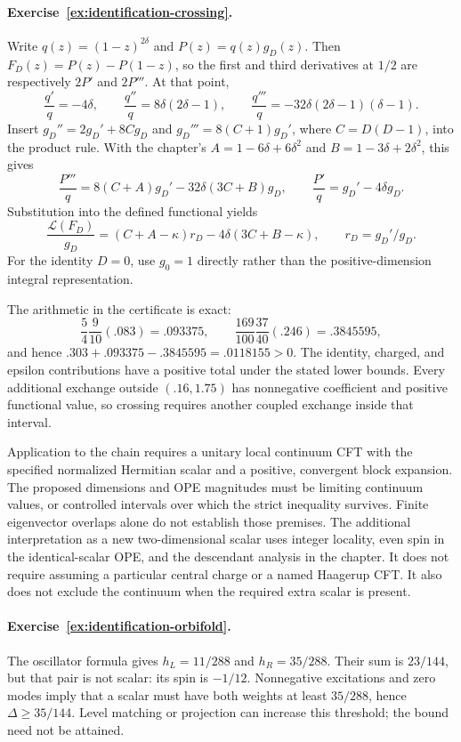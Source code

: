 \paragraph{Exercise~\ref{ex:identification-crossing}.}
\label{sol:ex:identification-crossing}
Write $q(z)=(1-z)^{2\delta}$ and $P(z)=q(z)g_D(z)$.
Then $F_D(z)=P(z)-P(1-z)$, so the first and third derivatives
at $1/2$ are respectively $2P'$ and $2P'''$. At that point,
\[
 \frac{q'}q=-4\delta,\qquad
 \frac{q''}q=8\delta(2\delta-1),\qquad
 \frac{q'''}q=-32\delta(2\delta-1)(\delta-1).
\]
Insert $g_D''=2g_D'+8Cg_D$ and
$g_D'''=8(C+1)g_D'$, where $C=D(D-1)$, into the product
rule. With the chapter's $A=1-6\delta+6\delta^2$ and
$B=1-3\delta+2\delta^2$, this gives
\[
 \frac{P'''}q=8(C+A)g_D'-32\delta(3C+B)g_D,
 \qquad \frac{P'}q=g_D'-4\delta g_D.
\]
Substitution into the defined functional yields
\[
 \frac{\mathcal L(F_D)}{g_D}
 =(C+A-\kappa)r_D-4\delta(3C+B-\kappa),
 \qquad r_D=g_D'/g_D.
\]
For the identity $D=0$, use $g_0=1$ directly rather than the
positive-dimension integral representation.

The arithmetic in the certificate is exact:
\[
 \frac54\frac9{10}(.083)=.093375,\qquad
 \frac{169}{100}\frac{37}{40}(.246)=.3845595,
\]
and hence $.303+.093375-.3845595=.0118155>0$.
The identity, charged, and epsilon contributions have a positive
total under the stated lower bounds. Every additional exchange
outside $(.16,1.75)$ has nonnegative coefficient and positive
functional value, so crossing requires another coupled exchange
inside that interval.

Application to the chain requires a unitary local continuum
CFT with the specified normalized Hermitian scalar and a positive,
convergent block expansion. The proposed dimensions and OPE
magnitudes must be limiting continuum values, or controlled
intervals over which the strict inequality survives. Finite
eigenvector overlaps alone do not establish those premises.
The additional interpretation as a new two-dimensional scalar
uses integer locality, even spin in the identical-scalar OPE,
and the descendant analysis in the chapter. It does not require
assuming a particular central charge or a named Haagerup CFT.
It also does not exclude the continuum when the required extra
scalar is present.



\paragraph{Exercise~\ref{ex:identification-orbifold}.}
\label{sol:ex:identification-orbifold}
The oscillator formula gives
$h_L=11/288$ and $h_R=35/288$. Their sum is $23/144$,
but that pair is not scalar: its spin is $-1/12$.
Nonnegative excitations and zero modes imply that a scalar
must have both weights at least $35/288$, hence
$\Delta\geq35/144$. Level matching or projection can
increase this threshold; the bound need not be attained.

